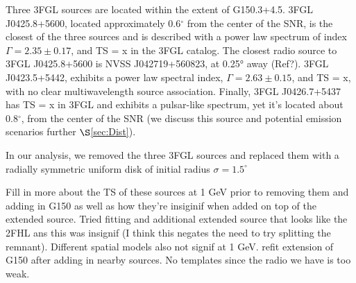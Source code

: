 \documentclass[preprint2]{aastex}
\newcommand{\Gone}{G150.3+4.5}
\begin{document}
Three  3FGL sources are located within the extent of \Gone. 3FGL J0425.8+5600, located approximately 0.6$^\circ$ from the center of the SNR, is the closest of the three sources and is described with a power law spectrum of index $\Gamma = 2.35\pm 0.17$, and TS = x in the 3FGL catalog. The closest radio source to 3FGL J0425.8+5600 is NVSS J042719+560823, at 0.25° away (Ref?). 3FGL J0423.5+5442, exhibits a power law spectral index, $\Gamma = 2.63\pm 0.15$, and TS = x, with no clear multiwavelength source association. Finally, 3FGL J0426.7+5437 has TS = x in 3FGL and exhibits a pulsar-like spectrum, yet it's located about 0.8$^{\circ}$, from the center of the SNR (we discuss this source and potential emission scenarios further $\S$\ref{sec:Dist}).

In our analysis, we removed the three 3FGL sources and replaced them with a radially symmetric uniform disk of initial radius $\sigma = 1.5^{\circ}$

Fill in more about the TS of these sources at 1 GeV prior to removing them and adding in G150 as well as how they're insiginif when added on top of the extended source. Tried fitting and additional extended source that looks like the 2FHL ans this was insignif (I think this negates the need to try splitting the remnant). Different spatial models also not signif at 1 GeV. refit extension of G150 after adding in nearby sources. No templates since the radio we have is too weak.

\begin{figure}[!ht]
	\begin{centering}
		\texttt{[image: \{ES\_4\_Region\_l150.0\_b0.0\_sources]}.png}
		\caption{Smoothed diffuse and isotropic subtracted counts map, E  $>$ 10 GeV.
			\label{fig:10gevResidCmap}}
	\end{centering}
\end{figure}
\end{document}
